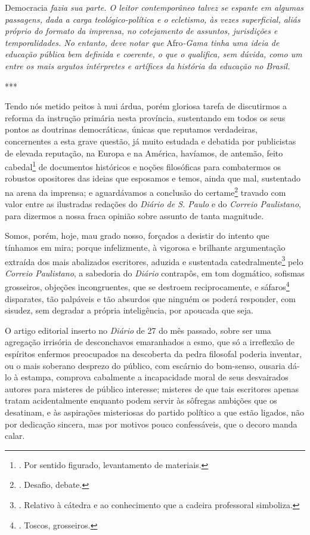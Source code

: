 Democracia \emph{fazia sua parte. O leitor contemporâneo talvez se
espante em algumas passagens, dada a carga teológico-política e o
ecletismo, às vezes superficial, aliás próprio do formato da imprensa,
no cotejamento de assuntos, jurisdições e temporalidades. No entanto,
deve notar que} Afro\emph{-Gama tinha uma ideia de educação pública bem
definida e coerente, o que o qualifica, sem dúvida, como um entre os
mais argutos intérpretes e artífices da história da educação no Brasil.}

***

Tendo nós metido peitos à mui árdua, porém gloriosa tarefa de
discutirmos a reforma da instrução primária nesta província, sustentando
em todos os seus pontos as doutrinas democráticas, únicas que reputamos
verdadeiras, concernentes a esta grave questão, já muito estudada e
debatida por publicistas de elevada reputação, na Europa e na América,
havíamos, de antemão, feito cabedal\footnote{. Por sentido figurado,
  levantamento de materiais.} de documentos históricos e noções
filosóficas para combatermos os robustos opositores das ideias que
esposamos e temos, ainda que mal, sustentado na arena da imprensa; e
aguardávamos a conclusão do certame\footnote{. Desafio, debate.} travado
com valor entre as ilustradas redações do \emph{Diário de S. Paulo} e do
\emph{Correio Paulistano}, para dizermos a nossa fraca opinião sobre
assunto de tanta magnitude.

Somos, porém, hoje, mau grado nosso, forçados a desistir do intento que
tínhamos em mira; porque infelizmente, à vigorosa e brilhante
argumentação extraída dos mais abalizados escritores, aduzida e
sustentada catedralmente\footnote{. Relativo à cátedra e ao conhecimento
  que a cadeira professoral simboliza.} pelo \emph{Correio Paulistano},
a sabedoria do \emph{Diário} contrapôs, em tom dogmático, sofismas
grosseiros, objeções incongruentes, que se destroem reciprocamente, e
sáfaros\footnote{. Toscos, grosseiros.} disparates, tão palpáveis e tão
absurdos que ninguém os poderá responder, com sisudez, sem degradar a
própria inteligência, por apoucada que seja.

O artigo editorial inserto no \emph{Diário} de 27 do mês passado, sobre
ser uma agregação irrisória de desconchavos emaranhados a esmo, que só a
irreflexão de espíritos enfermos preocupados na descoberta da pedra
filosofal poderia inventar, ou o mais soberano desprezo do público, com
escárnio do bom-senso, ousaria dá-lo à estampa, comprova cabalmente a
incapacidade moral de seus desvairados autores para misteres de público
interesse; misteres de que tais escritores apenas tratam acidentalmente
enquanto podem servir às sôfregas ambições que os desatinam, e às
aspirações misteriosas do partido político a que estão ligados, não por
dedicação sincera, mas por motivos pouco confessáveis, que o decoro
manda calar.

